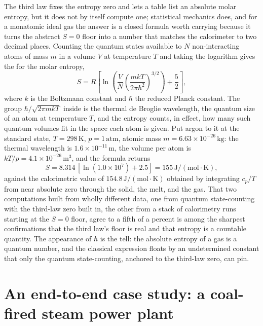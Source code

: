 \begin{mastery}
The third law fixes the entropy zero and lets a table list an absolute molar
entropy, but it does not by itself compute one; statistical mechanics does, and
for a monatomic ideal gas the answer is a closed formula worth carrying because it
turns the abstract $S = 0$ floor into a number that matches the calorimeter to two
decimal places. Counting the quantum states available to $N$ non-interacting atoms
of mass $m$ in a volume $V$ at temperature $T$ and taking the logarithm gives the
 for the molar entropy,
\[
S = R\left[\ln\!\left(\frac{V}{N}\left(\frac{m k T}{2\pi\hbar^2}\right)^{3/2}
\right) + \frac{5}{2}\right],
\]
where $k$ is the Boltzmann constant and $\hbar$ the reduced Planck constant. The
group $\hbar/\sqrt{2\pi m k T}$ inside is the thermal de Broglie wavelength, the
quantum size of an atom at temperature $T$, and the entropy counts, in effect, how
many such quantum volumes fit in the space each atom is given. Put argon to it at
the standard state, $T = 298\,\si{\kelvin}$, $p = 1\,\text{atm}$, atomic mass
$m = 6.63\times 10^{-26}\,\text{kg}$: the thermal wavelength is $1.6\times
10^{-11}\,\text{m}$, the volume per atom is $kT/p = 4.1\times 10^{-26}\,\text{m}^3$,
and the formula returns
\[
S = 8.314\,[\ln(1.0\times 10^{7}) + 2.5] = 155\,\text{J}/(\text{mol}\cdot
\si{\kelvin}),
\]
against the calorimetric value of $154.8\,\text{J}/(\text{mol}\cdot\si{\kelvin})$
obtained by integrating $c_p/T$ from near absolute zero through the solid, the
melt, and the gas. That two computations built from wholly different data, one
from quantum state-counting with the third-law zero built in, the other from a
stack of calorimetry runs starting at the $S = 0$ floor, agree to a fifth of a
percent is among the sharpest confirmations that the third law's floor is real and
that entropy is a countable quantity. The appearance of $\hbar$ is the tell: the
absolute entropy of a gas is a quantum number, and the classical expression floats
by an undetermined constant that only the quantum state-counting, anchored to the
third-law zero, can pin.
\end{mastery}

\section{An end-to-end case study: a coal-fired steam power plant}

